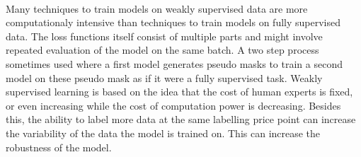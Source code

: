 \\[5pt]
\par{
    Many techniques to train models on weakly supervised data are more computationaly intensive than techniques to train models on fully supervised data.
    The loss functions itself consist of multiple parts and might involve repeated evaluation of the model on the same batch. 
    A two step process sometimes used where a first model generates pseudo masks to train a second model on these pseudo mask as if it were a fully supervised task.
    Weakly supervised learning is based on the idea that the cost of human experts is fixed, or even increasing while the cost of computation power is decreasing.
    Besides this, the ability to label more data at the same labelling price point can increase the variability of the data the model is trained on. 
    This can increase the robustness of the model.
}